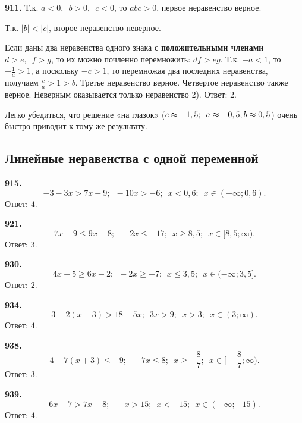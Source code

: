 \textbf{911.} Т.к. $a<0,\enspace b>0,\enspace c<0$, то $abc>0$, первое неравенство верное. 

Т.к. $|b|<|c|$, второе неравенство неверное. 

Если даны два неравенства одного знака с \textbf{положительными членами} $d>e,\enspace f>g$, то их можно почленно перемножить: $df>eg$. Т.к. $-a<1$, то $-\frac{1}{a}>1$, а поскольку $-c>1$, то перемножая два последних неравенства, получаем  $\frac{c}{a}>1>b$. Третье неравенство верное. Четвертое неравенство также верное. Неверным оказывается только неравенство 2). \newline \null \hspace*{\fill} Ответ: $2$.

Легко убедиться, что решение «на глазок» ($c\approx-1,5;\enspace a\approx-0,5;\linebreak b\approx0,5$) очень быстро приводит к тому же результату.


\subsection{Линейные неравенства с одной переменной}

\textbf{915.} $$-3-3x>7x-9;\enspace -10x>-6;\enspace x<0,6;\enspace x\in(-\infty;0,6).$$ \newline \null \hspace*{\fill} Ответ: $4$. 

\textbf{921.} $$7x+9\leq9x-8;\enspace -2x\leq-17;\enspace x\geq8,5;\enspace x\in[8,5;\infty).$$ \newline \null \hspace*{\fill} Ответ: $3$. 

\textbf{930.} $$4x+5\geq6x-2;\enspace-2x\geq-7;\enspace x\leq3,5;\enspace x\in(-\infty;3,5].$$ \newline \null \hspace*{\fill} Ответ: $2$. 

\textbf{934.} $$3-2(x-3)>18-5x;\enspace 3x>9;\enspace x>3;\enspace x\in(3;\infty).$$ \newline \null \hspace*{\fill} Ответ: $4$.

\textbf{938.} $$4-7(x+3)\leq-9;\enspace -7x\leq8;\enspace x\geq-\frac{8}{7};\enspace x\in\bigg[-\frac{8}{7};\infty\bigg).$$ \newline \null \hspace*{\fill} Ответ: $3$. 

\textbf{939.} $$6x-7>7x+8;\enspace -x>15;\enspace x<-15;\enspace x\in(-\infty;-15).$$ \newline \null \hspace*{\fill} Ответ: $4$.

